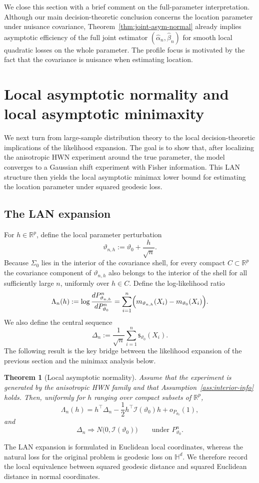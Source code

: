 \documentclass[11pt]{article}
\newtheorem{theorem}{Theorem}[section]
\newcommand{\R}{\mathbb{R}}
\newcommand{\Hh}{\mathbb{H}}
\newcommand{\score}{\mathsf{s}}
\newcommand{\info}{\mathcal{I}}
\begin{document}
We close this section with a brief comment on the full-parameter interpretation. Although our main decision-theoretic conclusion concerns the location parameter under nuisance covariance, Theorem~\ref{thm:joint-asym-normal} already implies asymptotic efficiency of the full joint estimator $(\hat\alpha_n,\hat\beta_n)$ for smooth local quadratic losses on the whole parameter. The profile focus is motivated by the fact that the covariance is nuisance when estimating location.




\section{Local asymptotic normality and local asymptotic minimaxity}
\label{sec:lan}

We next turn from large-sample distribution theory to the local decision-theoretic implications of the likelihood expansion. The goal is to show that, after localizing the anisotropic HWN experiment around the true parameter, the model converges to a Gaussian shift experiment with Fisher information. This LAN structure then yields the local asymptotic minimax lower bound for estimating the location parameter under squared geodesic loss.

\subsection{The LAN expansion}

For $h\in\R^p$, define the local parameter perturbation
\[
\vartheta_{n,h}:=\vartheta_0+\frac{h}{\sqrt n}.
\]
Because $\Sigma_0$ lies in the interior of the covariance shell, for every compact $C\subset\R^p$ the covariance component of $\vartheta_{n,h}$ also belongs to the interior of the shell for all sufficiently large $n$, uniformly over $h\in C$. Define the log-likelihood ratio
\[
\Lambda_n(h)
:=
\log\frac{dP_{\vartheta_{n,h}}^n}{dP_{\vartheta_0}^n}
=
\sum_{i=1}^n \Bigl(m_{\vartheta_{n,h}}(X_i)-m_{\vartheta_0}(X_i)\Bigr).
\]
We also define the central sequence
\[
\Delta_n:=\frac1{\sqrt n}\sum_{i=1}^n \score_{\vartheta_0}(X_i).
\]
The following result is the key bridge between the likelihood expansion of the previous section and the minimax analysis below.

\begin{theorem}[Local asymptotic normality]
\label{thm:lan}
Assume that the experiment is generated by the anisotropic HWN family and that Assumption~\ref{ass:interior-info} holds. Then, uniformly for $h$ ranging over compact subsets of $\R^p$,
\begin{equation}
\label{eq:lan}
\Lambda_n(h)
=
h^\top \Delta_n
-\frac12 h^\top \info(\vartheta_0) h
+o_{P_{\vartheta_0}}(1),
\end{equation}
and
\[
\Delta_n\Rightarrow N\bigl(0,\info(\vartheta_0)\bigr)
\qquad\text{under }P_{\vartheta_0}^n.
\]
\end{theorem}
The LAN expansion is formulated in Euclidean local coordinates, whereas the natural loss for the original problem is geodesic loss on \(\Hh^d\). We therefore record the local equivalence between squared geodesic distance and squared Euclidean distance in normal coordinates.
\end{document}
